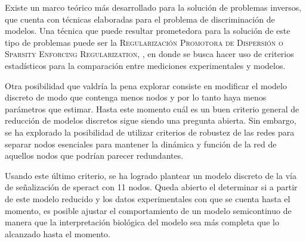 Existe un marco teórico más desarrollado para la solución de problemas inversos, que cuenta con técnicas elaboradas para el problema de discriminación de modelos. Una técnica que puede resultar prometedora para la solución de este tipo de problemas puede ser la \textsc{Regularización Promotora de Dispersión o Sparsity Enforcing Regularization}, \citeauthor{Engl2009} \citep{Engl2009}, en donde se busca hacer uso de criterios estadísticos para la comparación entre mediciones experimentales y modelos.

Otra posibilidad que valdría la pena explorar consiste en modificar el modelo discreto de modo que contenga menos nodos y por lo tanto haya menos parámetros que estimar. Hasta este momento cuál es un buen criterio general de reducción de modelos discretos sigue siendo una pregunta abierta. Sin embargo, se ha explorado la posibilidad de utilizar criterios de robustez de las redes para separar nodos esenciales para mantener la dinámica y función de la red de aquellos nodos que podrían parecer redundantes.

Usando este último criterio, se ha logrado plantear un modelo discreto de la vía de señalización de speract con 11 nodos. Queda abierto el determinar si a partir de este modelo reducido y los datos experimentales con que se cuenta hasta el momento, es posible ajustar el comportamiento de un modelo semicontinuo de manera que la interpretación biológica del modelo sea más completa que lo alcanzado hasta el momento.

%


